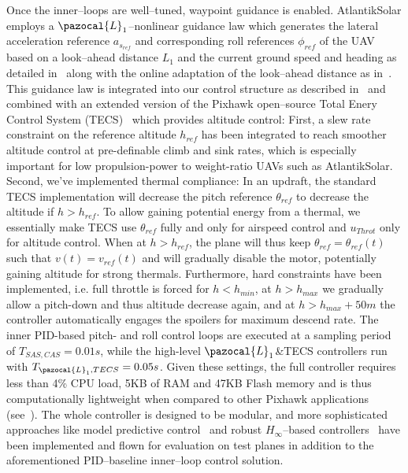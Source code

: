 Once the inner--loops are well--tuned, waypoint guidance is enabled. AtlantikSolar employs a $\pazocal{L}_1$--nonlinear guidance law which generates the lateral acceleration reference $a_{s_{ref}}$ and corresponding roll references $\phi_{ref}$ of the UAV based on a look--ahead distance ${L}_1$ and the current ground speed and heading as detailed in~\cite{HOW_L1nav} along with the online adaptation of the look--ahead distance as in~\cite{park2007performance}. This guidance law is integrated into our control structure as described in~\cite{Oettershagen_MED14_L1MPC} and combined with an extended version of the Pixhawk open--source Total Enery Control System (TECS)~\cite{PixhawkWebsite} which provides altitude control: First, a slew rate constraint on the reference altitude $h_{ref}$ has been integrated to reach smoother altitude control at pre-definable climb and sink rates, which is especially important for low propulsion-power to weight-ratio UAVs such as AtlantikSolar. Second, we've implemented thermal compliance: In an updraft, the standard TECS implementation will decrease the pitch reference $\theta_{ref}$ to decrease the altitude if $h>h_{ref}$. To allow gaining potential energy from a thermal, we essentially make TECS use $\theta_{ref}$ fully and only for airspeed control and $u_{Throt}$ only for altitude control. When at $h>h_{ref}$, the plane will thus keep $\theta_{ref}=\theta_{ref}(t)$  such that $v(t)=v_{ref}(t)$ and will gradually disable the motor, potentially gaining altitude for strong thermals. Furthermore, hard constraints have been implemented, i.e. full throttle is forced for $h<h_{min}$, at $h>h_{max}$ we gradually allow a pitch-down and thus altitude decrease again, and at $h>h_{max}+50m$ the controller automatically engages the spoilers for maximum descend rate. The inner PID-based pitch- and roll control loops are executed at a sampling period of $T_{SAS,CAS}=0.01s$, while the high-level $\pazocal{L}_1$\&TECS controllers run with $T_{\pazocal{L}_1,TECS}=0.05s$. Given these settings, the full controller requires less than 4\% CPU load, 5KB of RAM and 47KB Flash memory and is thus computationally lightweight when compared to other Pixhawk applications (see~\cite{Oettershagen_MED14_L1MPC}).%
The whole controller is designed to be modular, and more sophisticated approaches like model predictive control~\cite{Oettershagen_MED14_L1MPC} and robust $H_\infty$--based controllers~\cite{Mosimann_FT} have been implemented and flown for evaluation on test planes in addition to the aforementioned PID--baseline inner--loop control solution. 